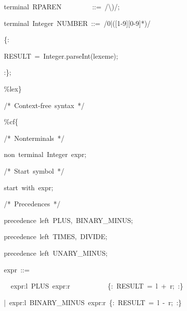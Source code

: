\documentclass[12pt,english,twoside]{report}
\newenvironment{codeblock}
{\begin{list}{}{
\setlength{\rightmargin}{\leftmargin}
\setlength{\listparindent}{0pt}%
\raggedright
\setlength{\itemsep}{0pt}
\setlength{\parsep}{0pt}
\normalfont\ttfamily}%
 \item[]}
{\end{list}}
\begin{document}
\begin{algorithm}
\begin{codeblock}
\begin{codeblock}
{\small terminal~RPAREN~~~~~~~~~::=~/\textbackslash{})/;}{\small \par}

{\small terminal~Integer~NUMBER~::=~/0|({[}1-9]{[}0-9]{*})/}{\small \par}

{\small \{:}{\small \par}
\begin{codeblock}
{\small RESULT~=~Integer.parseInt(lexeme);}{\small \par}
\end{codeblock}
{\small :\};}{\small \par}
\end{codeblock}
{\small \%lex\}}{\small \par}



{\small /{*}~Context-free~syntax~{*}/}{\small \par}

{\small \%cf\{}{\small \par}
\begin{codeblock}
{\small /{*}~Nonterminals~{*}/}{\small \par}

{\small non~terminal~Integer~expr;}{\small \par}



{\small /{*}~Start~symbol~{*}/}{\small \par}

{\small start~with~expr;}{\small \par}



{\small /{*}~Precedences~{*}/}{\small \par}

{\small precedence~left~PLUS,~BINARY\_MINUS;}{\small \par}

{\small precedence~left~TIMES,~DIVIDE;}{\small \par}

{\small precedence~left~UNARY\_MINUS;}{\small \par}



{\small expr~::=}{\small \par}
\begin{codeblock}
~{\small ~expr:l~PLUS~expr:r~~~~~~~~~~~\{:~RESULT~=~l~+~r;~:\}}{\small \par}

{\small |~expr:l~BINARY\_MINUS~expr:r~\{:~RESULT~=~l~-~r;~:\}}{\small \par}


\end{codeblock}
\end{codeblock}
\end{codeblock}
\end{algorithm}
\end{document}
